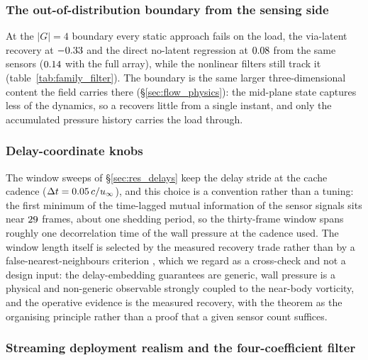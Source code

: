 \subsubsection*{The out-of-distribution boundary from the sensing side}
At the $|G| = 4$ boundary every static approach fails on the load, the
via-latent recovery at $-0.33$ and the direct no-latent regression at
$0.08$ from the same sensors ($0.14$ with the full
array), while the nonlinear filters still track it (table~\ref{tab:family_filter}). The
boundary is the same larger three-dimensional content the field carries there
(\S\ref{sec:flow_physics}): the mid-plane state captures less of the dynamics, so
a \StaticInv{} recovers little from a single instant, and only the accumulated
pressure history carries the load through.\re

\subsubsection*{Delay-coordinate knobs}
The window sweeps of \S\ref{sec:res_delays} keep the delay stride at the cache
cadence ($\Delta t = 0.05\,c/u_\infty$), and this choice is a convention rather
than a tuning: the first minimum of the time-lagged mutual information of the
sensor signals \citep{fraser1986} sits near $29$ frames, about one shedding
period, so the thirty-frame window spans roughly one decorrelation time of the
wall pressure at the cadence used. The window length itself is selected by the
measured recovery trade rather than by a false-nearest-neighbours criterion
\citep{kennel1992}, which we regard as a cross-check and not a design input: the
delay-embedding guarantees are generic, wall pressure is a physical and
non-generic observable strongly coupled to the near-body vorticity, and the
operative evidence is the measured recovery, with the theorem as the organising
principle rather than a proof that a given sensor count suffices.\re

\subsubsection*{Streaming deployment realism and the four-coefficient filter}

